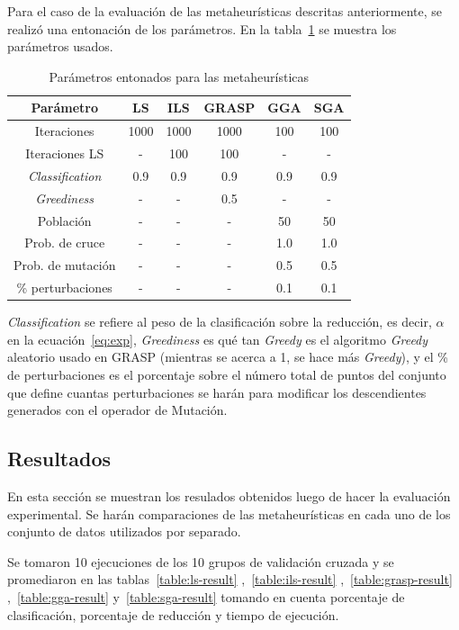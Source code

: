 \documentclass{ci5652}
\begin{document}
	Para el caso de la evaluación de las metaheurísticas descritas anteriormente, se realizó una entonación de los parámetros. En la tabla~\ref{table:parameters} se muestra los parámetros usados.  

\begin{table}[!h]
	\centering
	\begin{tabular}{c c c c c c}
	\hline
	Parámetro & LS & ILS & GRASP & GGA & SGA \\
	\hline
	Iteraciones & 1000 & 1000 & 1000 & 100 & 100 \\
	Iteraciones LS & - & 100 & 100 & - & - \\
	\textit{Classification} & 0.9 & 0.9 & 0.9 & 0.9 & 0.9 \\
	\textit{Greediness} & - & - & 0.5 & - & - \\
	Población & - & - & - & 50 & 50 \\
	Prob. de cruce & - & - & - & 1.0 & 1.0 \\
	Prob. de mutación & - & - & - & 0.5 & 0.5 \\
	\% perturbaciones & - & - & - & 0.1 & 0.1 \\
	\end{tabular}
	\caption{Parámetros entonados para las metaheurísticas}
	\label{table:parameters}
\end{table}

\textit{Classification} se refiere al peso de la clasificación sobre la reducción, es decir, $\alpha$ en la ecuación~\ref{eq:exp}, \textit{Greediness} es qué tan \textit{Greedy} es el algoritmo \textit{Greedy} aleatorio usado en GRASP (mientras se acerca a 1, se hace más \textit{Greedy}), y el \% de perturbaciones es el porcentaje sobre el número total de puntos del conjunto que define cuantas perturbaciones se harán para modificar los descendientes generados con el operador de Mutación.


\subsection{Resultados}
En esta sección se muestran los resulados obtenidos luego de hacer la evaluación experimental. Se harán comparaciones de las metaheurísticas en cada uno de los conjunto de datos utilizados por separado.

Se tomaron 10 ejecuciones de los 10 grupos de validación cruzada y se promediaron en las tablas~\ref{table:ls-result} ,~\ref{table:ils-result} ,~\ref{table:grasp-result} ,~\ref{table:gga-result} y~\ref{table:sga-result} tomando en cuenta porcentaje de clasificación, porcentaje de reducción y tiempo de ejecución.
\end{document}
